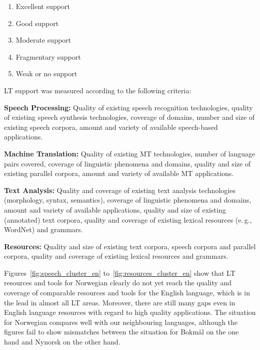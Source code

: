 \begin{multicols}{2}
\begin{enumerate}
\item Excellent support
\item Good support
\item Moderate support
\item Fragmentary support
\item Weak or no support
\end{enumerate}

LT support was measured according to the following criteria:

\textbf{Speech Processing:} Quality of existing speech recognition technologies, quality of existing speech synthesis technologies, coverage of domains, number and size of existing speech corpora, amount and variety of available speech-based applications.

\textbf{Machine Translation:} Quality of existing MT technologies, number of language pairs covered, coverage of linguistic phenomena and domains, quality and size of existing parallel corpora, amount and variety of available MT applications.

\textbf{Text Analysis:} Quality and coverage of existing text analysis technologies (morphology, syntax, semantics), coverage of linguistic phenomena and domains, amount and variety of available applications, quality and size of existing (annotated) text corpora, quality and coverage of existing lexical resources (e.\,g., WordNet) and grammars.

\textbf{Resources:} Quality and size of existing text corpora, speech corpora and parallel corpora, quality and coverage of existing lexical resources and grammars.

Figures~\ref{fig:speech_cluster_en} to~\ref{fig:resources_cluster_en} show that LT resources and tools for Norwegian clearly do not yet reach the quality and coverage of comparable resources and tools for the English language, which is in the lead in almost all LT areas. 
Moreover, there are still many gaps even in English language resources with regard to high quality applications. 
The situation for Norwegian compares well with our neighbouring languages, although the figures fail to show mismatches between the situation for Bokmål on the one hand and Nynorsk on the other hand. 



\end{multicols}
